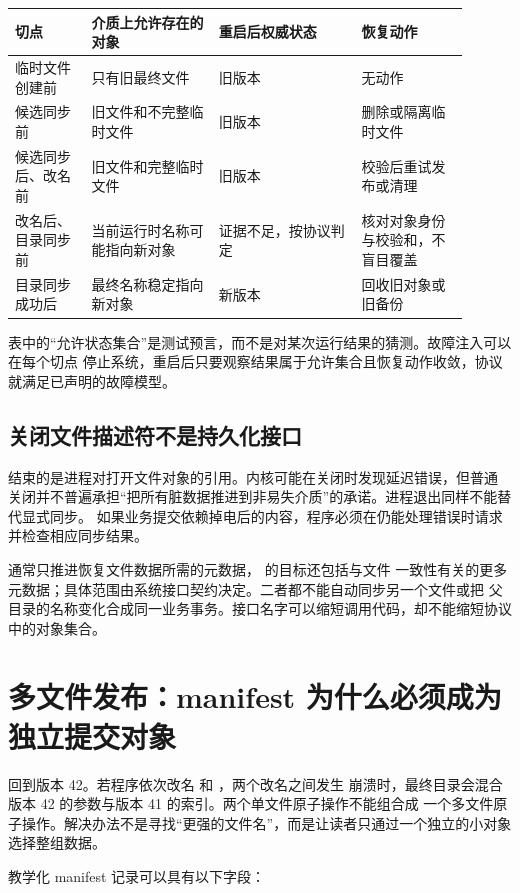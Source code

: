 \begin{longtable}{|L{0.15\linewidth}|L{0.25\linewidth}|L{0.29\linewidth}|L{0.21\linewidth}|}
\hline
切点 & 介质上允许存在的对象 & 重启后权威状态 & 恢复动作 \\ \hline
临时文件创建前 & 只有旧最终文件 & 旧版本 & 无动作 \\\tablerowrule
候选同步前 & 旧文件和不完整临时文件 & 旧版本 & 删除或隔离临时文件 \\\tablerowrule
候选同步后、改名前 & 旧文件和完整临时文件 & 旧版本 & 校验后重试发布或清理 \\\tablerowrule
改名后、目录同步前 & 当前运行时名称可能指向新对象 & 证据不足，按协议判定 &
核对对象身份与校验和，不盲目覆盖 \\\tablerowrule
目录同步成功后 & 最终名称稳定指向新对象 & 新版本 & 回收旧对象或旧备份 \\
\hline
\end{longtable}

表中的“允许状态集合”是测试预言，而不是对某次运行结果的猜测。故障注入可以在每个切点
停止系统，重启后只要观察结果属于允许集合且恢复动作收敛，协议就满足已声明的故障模型。

\subsection{关闭文件描述符不是持久化接口}

 结束的是进程对打开文件对象的引用。内核可能在关闭时发现延迟错误，但普通
关闭并不普遍承担“把所有脏数据推进到非易失介质”的承诺。进程退出同样不能替代显式同步。
如果业务提交依赖掉电后的内容，程序必须在仍能处理错误时请求并检查相应同步结果。

 通常只推进恢复文件数据所需的元数据， 的目标还包括与文件
一致性有关的更多元数据；具体范围由系统接口契约决定。二者都不能自动同步另一个文件或把
父目录的名称变化合成同一业务事务。接口名字可以缩短调用代码，却不能缩短协议中的对象集合。

\section{多文件发布：manifest 为什么必须成为独立提交对象}

回到版本 42。若程序依次改名  和 ，两个改名之间发生
崩溃时，最终目录会混合版本 42 的参数与版本 41 的索引。两个单文件原子操作不能组合成
一个多文件原子操作。解决办法不是寻找“更强的文件名”，而是让读者只通过一个独立的小对象
选择整组数据。

教学化 manifest 记录可以具有以下字段：

